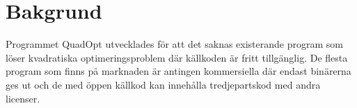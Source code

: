 \section{Bakgrund}
Programmet QuadOpt utvecklades för att det saknas existerande program som löser kvadratiska optimeringsproblem där källkoden är fritt tillgänglig. De flesta program som finns på marknaden är antingen kommersiella där endast binärerna ges ut och de med öppen källkod kan innehålla tredjepartskod med andra licenser.